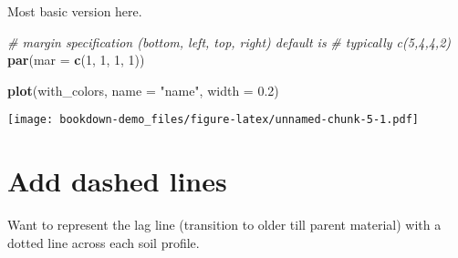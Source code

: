 \documentclass[
]{book}
\newenvironment{Shaded}{\begin{snugshade}}{\end{snugshade}}
\newcommand{\CommentTok}[1]{\textcolor[rgb]{0.56,0.35,0.01}{\textit{#1}}}
\newcommand{\DataTypeTok}[1]{\textcolor[rgb]{0.13,0.29,0.53}{#1}}
\newcommand{\DecValTok}[1]{\textcolor[rgb]{0.00,0.00,0.81}{#1}}
\newcommand{\FloatTok}[1]{\textcolor[rgb]{0.00,0.00,0.81}{#1}}
\newcommand{\KeywordTok}[1]{\textcolor[rgb]{0.13,0.29,0.53}{\textbf{#1}}}
\newcommand{\NormalTok}[1]{#1}
\newcommand{\StringTok}[1]{\textcolor[rgb]{0.31,0.60,0.02}{#1}}
\begin{document}
Most basic version here.

\begin{Shaded}
\begin{Highlighting}[]
\CommentTok{\# margin specification (bottom, left, top, right) default is}
\CommentTok{\# typically c(5,4,4,2)}
\KeywordTok{par}\NormalTok{(}\DataTypeTok{mar =} \KeywordTok{c}\NormalTok{(}\DecValTok{1}\NormalTok{, }\DecValTok{1}\NormalTok{, }\DecValTok{1}\NormalTok{, }\DecValTok{1}\NormalTok{))}

\KeywordTok{plot}\NormalTok{(with\_colors, }\DataTypeTok{name =} \StringTok{"name"}\NormalTok{, }\DataTypeTok{width =} \FloatTok{0.2}\NormalTok{)}
\end{Highlighting}
\end{Shaded}

\texttt{[image: bookdown-demo\_files/figure-latex/unnamed-chunk-5-1.pdf]}

\hypertarget{add-dashed-lines}{%
\section{Add dashed lines}\label{add-dashed-lines}}

Want to represent the lag line (transition to older till parent material) with a dotted line across each soil profile.
\end{document}
